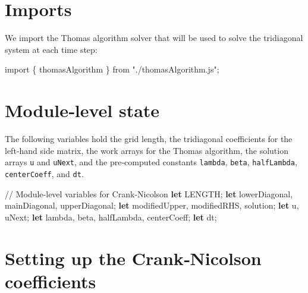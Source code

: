 \documentclass[
  letterpaper,
  DIV=11,
  numbers=noendperiod]{scrreprt}
\newenvironment{Shaded}{\begin{snugshade}}{\end{snugshade}}
\newcommand{\CommentTok}[1]{\textcolor[rgb]{0.37,0.37,0.37}{#1}}
\newcommand{\ImportTok}[1]{\textcolor[rgb]{0.00,0.46,0.62}{#1}}
\newcommand{\KeywordTok}[1]{\textcolor[rgb]{0.00,0.23,0.31}{\textbf{#1}}}
\newcommand{\NormalTok}[1]{\textcolor[rgb]{0.00,0.23,0.31}{#1}}
\newcommand{\OperatorTok}[1]{\textcolor[rgb]{0.37,0.37,0.37}{#1}}
\newcommand{\StringTok}[1]{\textcolor[rgb]{0.13,0.47,0.30}{#1}}
\begin{document}
\section{Imports}\label{imports}

We import the Thomas algorithm solver that will be used to solve the
tridiagonal system at each time step:

\label{cn-imports}%
\begin{Shaded}
\begin{Highlighting}[]
\ImportTok{import}\NormalTok{ \{ thomasAlgorithm \} }\ImportTok{from} \StringTok{"./thomasAlgorithm.js"}\OperatorTok{;}
\end{Highlighting}
\end{Shaded}

\section{Module‑level state}\label{modulelevel-state}

The following variables hold the grid length, the tridiagonal
coefficients for the left‑hand side matrix, the work arrays for the
Thomas algorithm, the solution arrays \texttt{u} and \texttt{uNext}, and
the pre‑computed constants \texttt{lambda}, \texttt{beta},
\texttt{halfLambda}, \texttt{centerCoeff}, and \texttt{dt}.

\label{cn-variables}%
\begin{Shaded}
\begin{Highlighting}[]
\CommentTok{// Module{-}level variables for Crank{-}Nicolson}
\KeywordTok{let}\NormalTok{ LENGTH}\OperatorTok{;}
\KeywordTok{let}\NormalTok{ lowerDiagonal}\OperatorTok{,}\NormalTok{ mainDiagonal}\OperatorTok{,}\NormalTok{ upperDiagonal}\OperatorTok{;}
\KeywordTok{let}\NormalTok{ modifiedUpper}\OperatorTok{,}\NormalTok{ modifiedRHS}\OperatorTok{,}\NormalTok{ solution}\OperatorTok{;}
\KeywordTok{let}\NormalTok{ u}\OperatorTok{,}\NormalTok{ uNext}\OperatorTok{;}
\KeywordTok{let}\NormalTok{ lambda}\OperatorTok{,}\NormalTok{ beta}\OperatorTok{,}\NormalTok{ halfLambda}\OperatorTok{,}\NormalTok{ centerCoeff}\OperatorTok{;}
\KeywordTok{let}\NormalTok{ dt}\OperatorTok{;}
\end{Highlighting}
\end{Shaded}

\section{Setting up the Crank‑Nicolson
coefficients}\label{setting-up-the-cranknicolson-coefficients}
\end{document}
